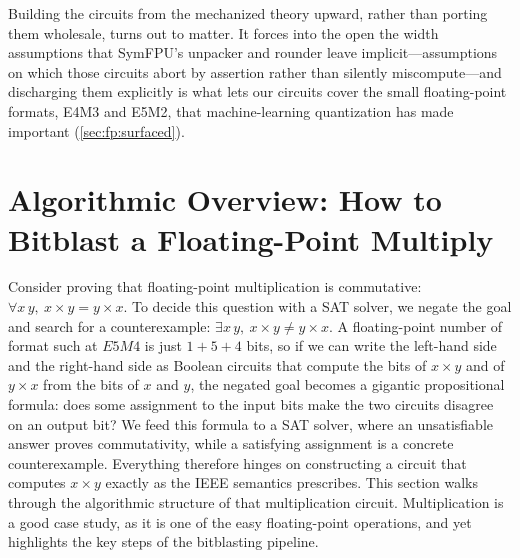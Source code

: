 Building the circuits from the mechanized theory upward, rather than porting them
wholesale, turns out to matter. It forces into the open the width assumptions
that SymFPU's unpacker and rounder leave implicit---assumptions on which those
circuits abort by assertion rather than silently miscompute---and discharging
them explicitly is what lets our circuits cover the small floating-point formats,
E4M3 and E5M2, that machine-learning quantization has made important
(\cref{sec:fp:surfaced}).

\section{Algorithmic Overview: How to Bitblast a Floating-Point Multiply}
\label{sec:fp:overview}

Consider proving that floating-point multiplication is commutative:
$\forall x\, y,\ x \times y = y \times x$.
To decide this question with a SAT solver, we negate the goal and search for a counterexample:
$\exists x\, y,\ x \times y \neq y \times x$.
A floating-point number of format such at $E5M4$ is just $1 + 5 + 4$ bits,
so if we can write the left-hand side and the right-hand side as Boolean circuits
that compute the bits of $x \times y$ and of $y \times x$ from the bits of $x$ and $y$,
the negated goal becomes a gigantic propositional formula:
does some assignment to the input bits make the two circuits disagree on an output bit?
We feed this formula to a SAT solver, where
an unsatisfiable answer proves commutativity,
while a satisfying assignment is a concrete counterexample.
Everything therefore hinges on constructing a circuit that computes $x \times y$
exactly as the IEEE semantics prescribes.
This section walks through the algorithmic structure of that multiplication circuit.
Multiplication is a good case study, as it is one of the easy floating-point operations,
and yet highlights the key steps of the bitblasting pipeline.

